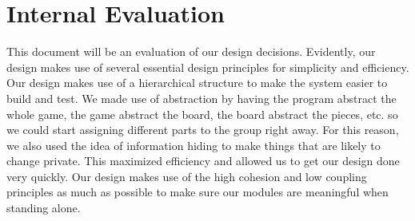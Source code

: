 \documentclass[10pt]{article}
\begin{document}
\section{Internal Evaluation}
This document will be an evaluation of our design decisions. Evidently, our design makes use of several essential design principles for simplicity and efficiency.  Our design makes use of a hierarchical structure to make the system easier to build and test.  We made use of abstraction by having the program abstract the whole game, the game abstract the board, the board abstract the pieces, etc. so we could start assigning different parts to the group right away.  For this reason, we also used the idea of information hiding to make things that are likely to change private.  This maximized efficiency and allowed us to get our design done very quickly.  Our design makes use of the high cohesion and low coupling principles as much as possible to make sure our modules are meaningful when standing alone.  
        

        
\end{document}
